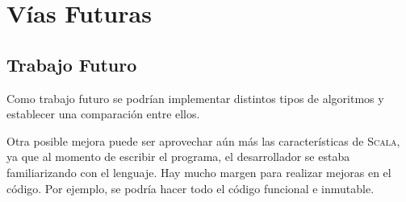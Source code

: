 \chapter{Vías Futuras}
\label{ch:future}

\section{Trabajo Futuro}
\label{sec:future}

Como trabajo futuro se podrían implementar distintos tipos de algoritmos y
establecer una comparación entre ellos.

Otra posible mejora puede ser aprovechar aún más las características de
\textsc{Scala}, ya que al momento de escribir el programa, el desarrollador se
estaba familiarizando con el lenguaje. Hay mucho margen para realizar mejoras en
el código. Por ejemplo, se podría hacer todo el código funcional e
inmutable.


